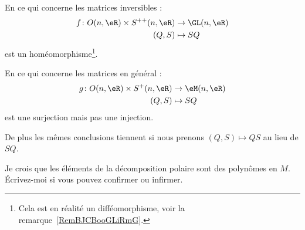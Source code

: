 \begin{theorem} \label{ThoLHebUAU}
	En ce qui concerne les matrices inversibles :
	\begin{equation}
		\begin{aligned}
			f\colon O(n,\eR)\times S^{++}(n,\eR) & \to \GL(n,\eR) \\
			(Q,S)                                & \mapsto SQ
		\end{aligned}
	\end{equation}
	est un homéomorphisme\footnote{Cela est en réalité un difféomorphisme, voir la remarque~\ref{RemBJCBooGLiRmG}.}.


	En ce qui concerne les matrices en général :
	\begin{equation}
		\begin{aligned}
			g\colon O(n,\eR)\times S^+(n,\eR) & \to \eM(n,\eR) \\
			(Q,S)                             & \mapsto SQ
		\end{aligned}
	\end{equation}
	est une surjection mais pas une injection.

	De plus les mêmes conclusions tiennent si nous prenons \( (Q,S)\mapsto QS\) au lieu de \( SQ\).
\end{theorem}


\begin{probleme}
	Je crois que les éléments de la décomposition polaire sont des polynômes en \( M\). Écrivez-moi si vous pouvez confirmer ou infirmer.
\end{probleme}

